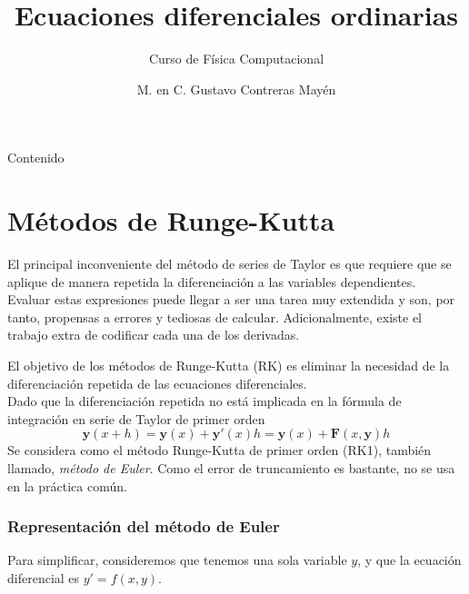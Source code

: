 

\usepackage{siunitx}
\usepackage[american,cuteinductors,smartlabels]{circuitikz}
\usetikzlibrary{calc}
\title{Ecuaciones diferenciales ordinarias}
\subtitle{Curso de Física Computacional}
\author[]{M. en C. Gustavo Contreras Mayén}

\maketitle
\fontsize{14}{14}\selectfont
{}
\begin{frame}{Contenido}
\tableofcontents[pausesections]
\end{frame}
\section{Métodos de Runge-Kutta}
\begin{frame}
El principal inconveniente del método de series de Taylor es que requiere que se aplique de manera repetida la diferenciación a las variables dependientes.
\\
\medskip
Evaluar estas expresiones puede llegar a ser una tarea muy extendida y son, por tanto, propensas a errores y tediosas de calcular. Adicionalmente, existe el trabajo extra de codificar cada una de los derivadas.
\end{frame}
\begin{frame}
El objetivo de los métodos de Runge-Kutta (RK) es eliminar la necesidad de la diferenciación repetida de las ecuaciones diferenciales. 
\\
\medskip
Dado que la diferenciación repetida no está implicada en la fórmula de integración en serie de Taylor de primer orden
\[ \mathbf{y}(x+h) = \mathbf{y}(x) + \mathbf{y}'(x) h = \mathbf{y}(x) + \mathbf{F}(x,\mathbf{y}) h \]
Se considera como el método Runge-Kutta de primer orden (RK1), también llamado, \emph{método de Euler}. Como el error de truncamiento es bastante, no se usa en la práctica común.
\end{frame}
\begin{frame}
\frametitle{Representación del método de Euler}
\begin{center}
\end{center}
Para simplificar, consideremos que tenemos una sola variable $y$, y que la ecuación diferencial es $y'=f(x,y)$.
\end{frame}

